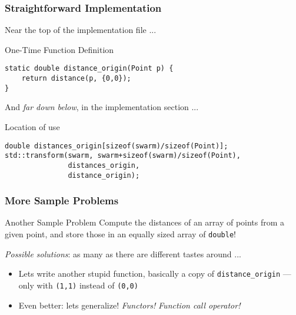 \begin{frame}[fragile]
  \frametitle{Straightforward Implementation}

  Near the top of the implementation file ...

  \begin{block}{One-Time Function Definition}
\begin{verbatim}
static double distance_origin(Point p) {
    return distance(p, {0,0});
}
\end{verbatim}
  \end{block}

  And \textit{far down below}, in the implementation section ...
  
  \begin{block}{Location of use}
\begin{verbatim}
double distances_origin[sizeof(swarm)/sizeof(Point)];
std::transform(swarm, swarm+sizeof(swarm)/sizeof(Point), 
               distances_origin, 
               distance_origin);
\end{verbatim}
  \end{block}
  
\end{frame}

\begin{frame}[fragile]
  \frametitle{More Sample Problems}

  \begin{block}{Another Sample Problem}
    Compute the distances of an array of points from a given point,
    and store those in an equally sized array of \texttt{double}!
  \end{block}

  \textit{Possible solutions}: as many as there are different tastes
  around ...
  
  \begin{itemize}
  \item Lets write another stupid function, basically a copy of
    \texttt{distance\_origin} --- only with \texttt{(1,1)} instead of
    \texttt{(0,0)}
  \item Even better: lets generalize! \textit{Functors!}
    \textit{Function call operator!}
  \end{itemize}
  
\end{frame}

